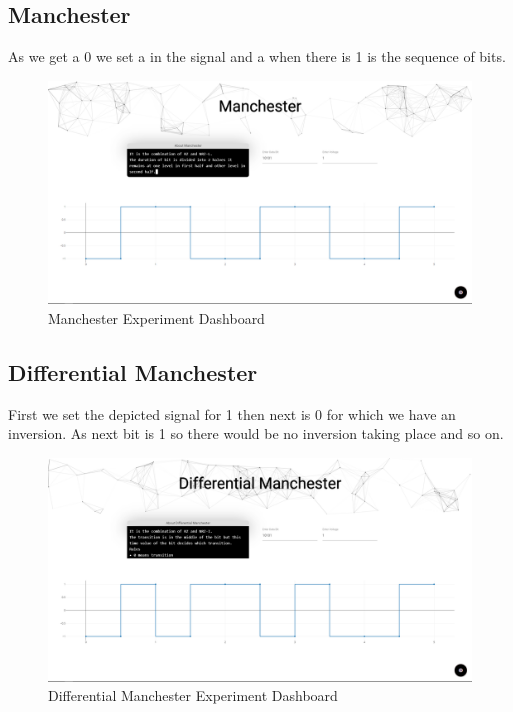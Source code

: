\documentclass[10pt,journal,compsoc]{IEEEtran}
\begin{document}
\subsection{Manchester}

As we get a 0 we set a  in the signal and a  when there is 1 is the sequence of bits.


\begin{figure}[H]
\centering
\includegraphics[scale=0.15]{manchester.png}
\caption{Manchester Experiment Dashboard}
\end{figure}

\subsection{Differential Manchester}

 First we set the depicted signal for 1 then next is 0 for which we have an inversion. As next bit is 1 so there would be no inversion taking place and so on.

\begin{figure}[H]
\centering
\includegraphics[scale=0.15]{diffmanchester.png}
\caption{Differential Manchester Experiment Dashboard}
\end{figure}
\end{document}
